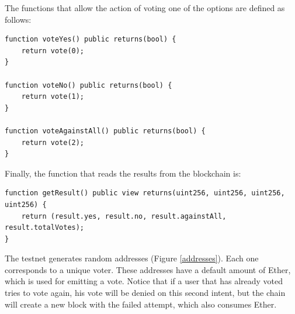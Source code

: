 \documentclass[10pt]{article}
\begin{document}
\begin{multicols}{2}
The functions that allow the action of voting one of the options are defined as follows:

\begin{lstlisting}[language=Solidity]
function voteYes() public returns(bool) {
	return vote(0);
}

function voteNo() public returns(bool) {
	return vote(1);
}

function voteAgainstAll() public returns(bool) {
	return vote(2);
}
\end{lstlisting}

Finally, the function that reads the results from the blockchain is:

\begin{lstlisting}[language=Solidity]
function getResult() public view returns(uint256, uint256, uint256, uint256) {
	return (result.yes, result.no, result.againstAll, result.totalVotes);
}
\end{lstlisting}

The testnet generates random addresses (Figure \ref{addresses}). Each one corresponds to a unique voter. These addresses have a default amount of Ether, which is used for emitting a vote. Notice that if a user that has already voted tries to vote again, his vote will be denied on this second intent, but the chain will create a new block with the failed attempt, which also consumes Ether.\\

\\\\


\end{multicols}
\end{document}
